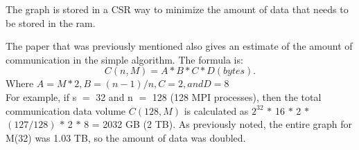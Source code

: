 The graph is stored in a CSR way to minimize the amount of data that needs to be stored in the ram.

The paper that was previously mentioned also gives an estimate of the amount of communication in the simple algorithm. The formula is:\\
\begin{equation}
\label{eq:communication_size}
C(n, M) = A * B * C * D (bytes).
\end{equation}
Where $A = M*2, B = (n-1)/n, C=2, and D=8$ \\

For example, if s $=$ 32 and n $=$ 128 (128 MPI processes), then the total communication 
data volume $C(128, M)$ is calculated as $2^{32}$ $*$ 16 $*$ 2 $*$ $(127/128)$ $*$ 2 $*$ 8 = 2032 GB (2 TB). As previously noted, the entire graph for M(32) was 
1.03 TB, so the amount of data was doubled.